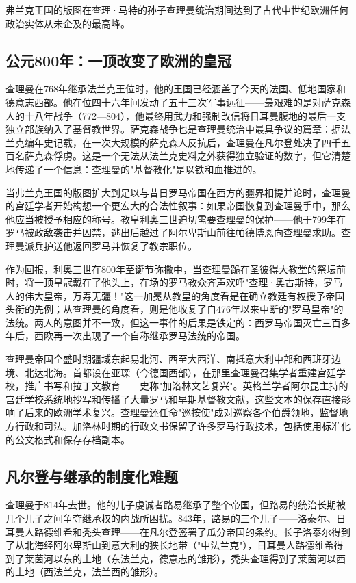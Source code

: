 \documentclass[a4paper,12pt]{ctexart}
\begin{document}
弗兰克王国的版图在查理·马特的孙子查理曼统治期间达到了古代中世纪欧洲任何政治实体从未企及的最高峰。

\subsection{公元800年：一顶改变了欧洲的皇冠}

查理曼在768年继承法兰克王位时，他的王国已经涵盖了今天的法国、低地国家和德意志西部。他在位四十六年间发动了五十三次军事远征——最艰难的是对萨克森人的十八年战争（772—804），他最终用武力和强制改信将日耳曼腹地的最后一支独立部族纳入了基督教世界。萨克森战争也是查理曼统治中最具争议的篇章：据法兰克编年史记载，在一次大规模的萨克森人反抗后，查理曼在凡尔登处决了四千五百名萨克森俘虏。这是一个无法从法兰克史料之外获得独立验证的数字，但它清楚地传递了一个信息：查理曼的"基督教化"是以铁和血推进的。

当弗兰克王国的版图扩大到足以与昔日罗马帝国在西方的疆界相提并论时，查理曼的宫廷学者开始构想一个更宏大的合法性叙事：如果帝国恢复到查理曼手中，那么他应当被授予相应的称号。教皇利奥三世迫切需要查理曼的保护——他于799年在罗马被政敌袭击并囚禁，逃出后越过了阿尔卑斯山前往帕德博恩向查理曼求助。查理曼派兵护送他返回罗马并恢复了教宗职位。

作为回报，利奥三世在800年至诞节弥撒中，当查理曼跪在圣彼得大教堂的祭坛前时，将一顶皇冠戴在了他头上，在场的罗马教众齐声欢呼"查理·奥古斯特，罗马人的伟大皇帝，万寿无疆！"这一加冕从教皇的角度看是在确立教廷有权授予帝国头衔的先例；从查理曼的角度看，则是他收复了自476年以来中断的"罗马皇帝"的法统。两人的意图并不一致，但这一事件的后果是铁定的：西罗马帝国灭亡三百多年后，西欧再一次出现了一个自称继承罗马法统的帝国。

查理曼帝国全盛时期疆域东起易北河、西至大西洋、南抵意大利中部和西班牙边境、北达北海。首都设在亚琛（今德国西部），在那里查理曼召集学者重建宫廷学校，推广书写和拉丁文教育——史称"加洛林文艺复兴"。英格兰学者阿尔昆主持的宫廷学校系统地抄写和传播了大量罗马和早期基督教文献，这些文本的保存直接影响了后来的欧洲学术复兴。查理曼还任命"巡按使"成对巡察各个伯爵领地，监督地方行政和司法。加洛林时期的行政文书保留了许多罗马行政技术，包括使用标准化的公文格式和保存存档副本。

\subsection{凡尔登与继承的制度化难题}

查理曼于814年去世。他的儿子虔诚者路易继承了整个帝国，但路易的统治长期被几个儿子之间争夺继承权的内战所困扰。843年，路易的三个儿子——洛泰尔、日耳曼人路德维希和秃头查理——在凡尔登签署了瓜分帝国的条约。长子洛泰尔得到了从北海经阿尔卑斯山到意大利的狭长地带（"中法兰克"），日耳曼人路德维希得到了莱茵河以东的土地（东法兰克，德意志的雏形），秃头查理得到了莱茵河以西的土地（西法兰克，法兰西的雏形）。
\end{document}
